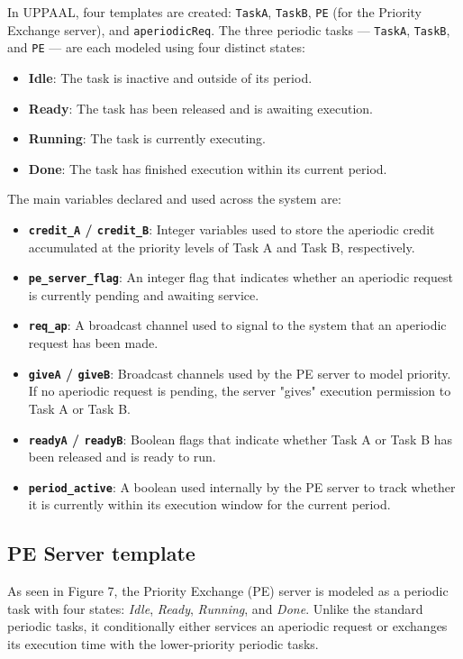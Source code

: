 \documentclass[conference]{IEEEtran}
\begin{document}
In UPPAAL, four templates are created: \texttt{TaskA}, \texttt{TaskB}, \texttt{PE} (for the Priority Exchange server), and \texttt{aperiodicReq}. The three periodic tasks — \texttt{TaskA}, \texttt{TaskB}, and \texttt{PE} — are each modeled using four distinct states:

\begin{itemize}
    \item \textbf{Idle}: The task is inactive and outside of its period.
    \item \textbf{Ready}: The task has been released and is awaiting execution.
    \item \textbf{Running}: The task is currently executing.
    \item \textbf{Done}: The task has finished execution within its current period.
\end{itemize}

The main variables declared and used across the system are:
\begin{itemize}
    \item \textbf{\texttt{credit\_A} / \texttt{credit\_B}}: Integer variables used to store the aperiodic credit accumulated at the priority levels of Task A and Task B, respectively.
    \item \textbf{\texttt{pe\_server\_flag}}: An integer flag that indicates whether an aperiodic request is currently pending and awaiting service.
    \item \textbf{\texttt{req\_ap}}: A broadcast channel used to signal to the system that an aperiodic request has been made.
    \item \textbf{\texttt{giveA} / \texttt{giveB}}: Broadcast channels used by the PE server to model priority. If no aperiodic request is pending, the server "gives" execution permission to Task A or Task B.
    \item \textbf{\texttt{readyA} / \texttt{readyB}}: Boolean flags that indicate whether Task A or Task B has been released and is ready to run.
    \item \textbf{\texttt{period\_active}}: A boolean used internally by the PE server to track whether it is currently within its execution window for the current period.
\end{itemize}

\subsection{PE Server template}
As seen in Figure 7, the Priority Exchange (PE) server is modeled as a periodic task with four states: \textit{Idle}, \textit{Ready}, \textit{Running}, and \textit{Done}. Unlike the standard periodic tasks, it conditionally either services an aperiodic request or exchanges its execution time with the lower-priority periodic tasks.
\end{document}
